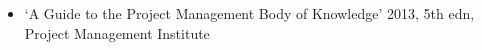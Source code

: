 \begin{itemize}
	\item ‘A Guide to the Project Management Body of Knowledge’ 2013, 5th edn, Project Management Institute
\end{itemize}